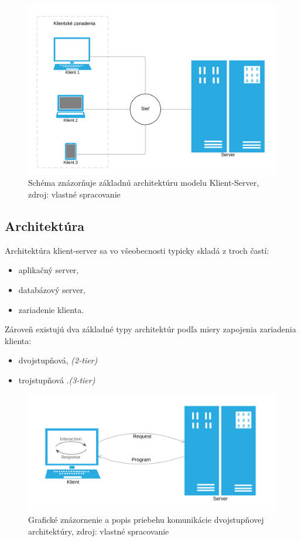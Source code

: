 \documentclass[
  digital, %
  oneside, %
  table,   %
  lof,     %
  nolot,   %
  nocover
]{fithesis3}
\begin{document}
\begin{figure}[t]
  \centering
    \includegraphics[width=.94\textwidth]{images/C-S-basic.png}
  \caption{Schéma znázorňuje základnú architektúru modelu Klient-Server, zdroj:
  vlastné spracovanie}
  \label{fig:cs-basic}
\end{figure}

\subsection{Architektúra}
Architektúra klient-server sa vo všeobecnosti typicky skladá z troch 
častí:
\begin{itemize}
	\item aplikačný server,
	\item databázový server,
	\item zariadenie klienta.
\end{itemize}
Zároveň existujú dva základné typy architektúr podľa miery zapojenia zariadenia klienta: 
\begin{itemize}
	\item dvojstupňová, \textit{(2-tier)}
	\item trojstupňová .\textit{(3-tier)}
\end{itemize}

\begin{figure}[t]
  \centering
    \includegraphics[width=.89\textwidth]{images/C-S-thick.png}
  \caption{Grafické znázornenie a popis priebehu komunikácie dvojstupňovej architektúry,
  zdroj: vlastné spracovanie}
  \label{fig:cs-thick}
\end{figure}
\end{document}
